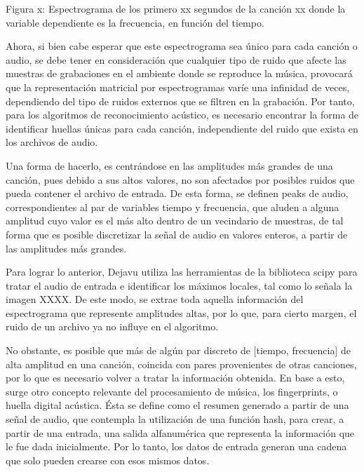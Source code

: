 \bigskip
[]
Figura x: Espectrograma de los primero xx segundos de la canción xx donde la variable dependiente es la frecuencia, en función del tiempo.
\bigskip

Ahora, si bien cabe esperar que este espectrograma sea único para cada canción o audio, se debe tener en consideración que cualquier tipo de ruido que afecte las muestras de grabaciones en el ambiente donde se reproduce la música, provocará que la representación matricial por espectrogramas varíe una infinidad de veces, dependiendo del tipo de ruidos externos que se filtren en la grabación. Por tanto, para los algoritmos de reconocimiento acústico, es necesario encontrar la forma de identificar huellas únicas para cada canción, independiente del ruido que exista en los archivos de audio.

\bigskip

Una forma de hacerlo, es centrándose en las amplitudes más grandes de una canción, pues debido a sus altos valores, no son afectados por posibles ruidos que pueda contener el archivo de entrada. De esta forma, se definen peaks de audio, correspondientes al par de variables tiempo y frecuencia, que aluden a alguna amplitud cuyo valor es el más alto dentro de un vecindario de muestras, de tal forma que es posible discretizar la señal de audio en valores enteros, a partir de las amplitudes más grandes.

\bigskip

Para lograr lo anterior, Dejavu utiliza las herramientas de la biblioteca scipy para tratar el audio de entrada e identificar los máximos locales, tal como lo señala la imagen XXXX. De este modo, se extrae toda aquella información del espectrograma que represente amplitudes altas, por lo que, para cierto margen, el ruido de un archivo ya no influye en el algoritmo.


\bigskip


No obstante, es posible que más de algún par discreto de [tiempo, frecuencia] de alta amplitud en una canción, coincida con pares provenientes de otras canciones, por lo que es necesario volver a tratar la información obtenida. En base a esto, surge otro concepto relevante del procesamiento de música, los fingerprints, o huella digital acústica. Ésta se define como el resumen generado a partir de una señal de audio, que contempla la utilización de una función hash, para crear, a partir de una entrada, una salida alfanumérica que representa la información que le fue dada inicialmente. Por lo tanto, los datos de entrada generan una cadena que solo pueden crearse con esos mismos datos.

